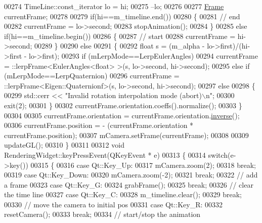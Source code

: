 \begin{DoxyCode}
00274   TimeLine::const\_iterator lo = hi;
00275   --lo;
00276 
00277   \hyperlink{class_frame}{Frame} currentFrame;
00278 
00279   \textcolor{keywordflow}{if}(hi==m\_timeline.end())
00280   \{
00281     \textcolor{comment}{// end}
00282     currentFrame = lo->second;
00283     stopAnimation();
00284   \}
00285   \textcolor{keywordflow}{else} \textcolor{keywordflow}{if}(hi==m\_timeline.begin())
00286   \{
00287     \textcolor{comment}{// start}
00288     currentFrame = hi->second;
00289   \}
00290   \textcolor{keywordflow}{else}
00291   \{
00292     \textcolor{keywordtype}{float} s = (m\_alpha - lo->first)/(hi->first - lo->first);
00293     \textcolor{keywordflow}{if} (mLerpMode==LerpEulerAngles)
00294       currentFrame = ::lerpFrame<EulerAngles<float> >(s, lo->second, hi->second);
00295     \textcolor{keywordflow}{else} \textcolor{keywordflow}{if} (mLerpMode==LerpQuaternion)
00296       currentFrame = ::lerpFrame<Eigen::Quaternionf>(s, lo->second, hi->second);
00297     \textcolor{keywordflow}{else}
00298     \{
00299       std::cerr << \textcolor{stringliteral}{"Invalid rotation interpolation mode (abort)\(\backslash\)n"};
00300       exit(2);
00301     \}
00302     currentFrame.orientation.coeffs().normalize();
00303   \}
00304 
00305   currentFrame.orientation = currentFrame.orientation.\hyperlink{group___geometry___module_a6a1d8af1fe34cb4127f705c0d10ef649}{inverse}();
00306   currentFrame.position = - (currentFrame.orientation * currentFrame.position);
00307   mCamera.setFrame(currentFrame);
00308 
00309   updateGL();
00310 \}
00311 
00312 \textcolor{keywordtype}{void} RenderingWidget::keyPressEvent(QKeyEvent * e)
00313 \{
00314     \textcolor{keywordflow}{switch}(e->key())
00315     \{
00316       \textcolor{keywordflow}{case} Qt::Key\_Up:
00317         mCamera.zoom(2);
00318         \textcolor{keywordflow}{break};
00319       \textcolor{keywordflow}{case} Qt::Key\_Down:
00320         mCamera.zoom(-2);
00321         \textcolor{keywordflow}{break};
00322       \textcolor{comment}{// add a frame}
00323       \textcolor{keywordflow}{case} Qt::Key\_G:
00324         grabFrame();
00325         \textcolor{keywordflow}{break};
00326       \textcolor{comment}{// clear the time line}
00327       \textcolor{keywordflow}{case} Qt::Key\_C:
00328         m\_timeline.clear();
00329         \textcolor{keywordflow}{break};
00330       \textcolor{comment}{// move the camera to initial pos}
00331       \textcolor{keywordflow}{case} Qt::Key\_R:
00332         resetCamera();
00333         \textcolor{keywordflow}{break};
00334       \textcolor{comment}{// start/stop the animation}

\end{DoxyCode}
